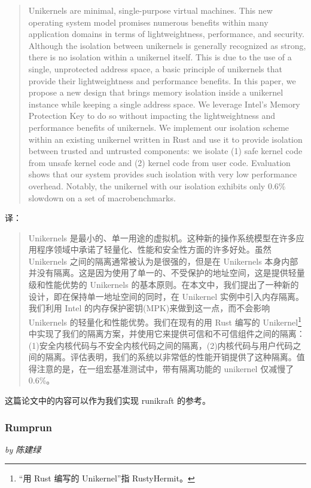 \documentclass[UTF8,fontset=none,linespread=1.15]{ctexart}
\newcommand{\sectionauthor}[1]{%
\vspace*{-5ex}
\noindent\textrm{\hfill\textit{by #1}}
\vspace*{3ex}\par}
\begin{document}
\begin{quote}
Unikernels are minimal, single-purpose virtual machines. This new operating system model promises numerous benefits within many application domains in terms of lightweightness, performance, and security. Although the isolation between unikernels is generally recognized as strong, there is no isolation within a unikernel itself. This is due to the use of a single, unprotected address space, a basic principle of unikernels that provide their lightweightness and performance benefits. In this paper, we propose a new design that brings memory isolation inside a unikernel instance while keeping a single address space. We leverage Intel’s Memory Protection Key to do so without impacting the lightweightness and performance benefits of unikernels. We implement our isolation scheme within an existing unikernel written in Rust and use it to provide isolation between trusted and untrusted components: we isolate (1) safe kernel code from unsafe kernel code and (2) kernel code from user code. Evaluation shows that our system provides such isolation with very low performance overhead. Notably, the unikernel with our isolation exhibits only 0.6\% slowdown on a set of macrobenchmarks.
\end{quote}

译：

\begin{quote}
Unikernels 是最小的、单一用途的虚拟机。这种新的操作系统模型在许多应用程序领域中承诺了轻量化、性能和安全性方面的许多好处。虽然 Unikernels 之间的隔离通常被认为是很强的，但是在 Unikernels 本身内部并没有隔离。这是因为使用了单一的、不受保护的地址空间，这是提供轻量级和性能优势的 Unikernels 的基本原则。在本文中，我们提出了一种新的设计，即在保持单一地址空间的同时，在 Unikernel 实例中引入内存隔离。我们利用 Intel 的内存保护密钥(MPK)来做到这一点，而不会影响 Unikernels 的轻量化和性能优势。我们在现有的用 Rust 编写的 Unikernel\footnote{“用 Rust 编写的 Unikernel”指 RustyHermit。} 中实现了我们的隔离方案，并使用它来提供可信和不可信组件之间的隔离：(1)安全内核代码与不安全内核代码之间的隔离，(2)内核代码与用户代码之间的隔离。评估表明，我们的系统以非常低的性能开销提供了这种隔离。值得注意的是，在一组宏基准测试中，带有隔离功能的 unikernel 仅减慢了0.6\%。
\end{quote}

这篇论文中的内容可以作为我们实现 runikraft 的参考。

\subsubsection{Rumprun}\sectionauthor{陈建绿}
\end{document}
